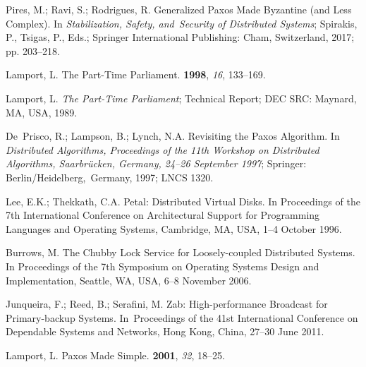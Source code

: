 \documentclass[algorithms,article,accept,moreauthors,pdftex,10pt,a4paper]{Definitions/mdpi}
\begin{document}
\begin{thebibliography}{999}

Pires, M.; Ravi, S.; Rodrigues, R.
\newblock Generalized Paxos Made Byzantine (and Less Complex).
\newblock In \emph{Stabilization, Safety, and~Security of Distributed Systems};
Spirakis, P., Tsigas, P., Eds.; Springer International Publishing: Cham, Switzerland, 
2017; pp. 203--218.

Lamport, L.
\newblock The {Part-Time} Parliament.
 {\bf 1998}, {\em
16}, 133--169.

Lamport, L.
\newblock \emph{The Part-Time Parliament};
\newblock Technical Report; DEC SRC: {Maynard, MA, USA}, 1989.

De~Prisco, R.; Lampson, B.; Lynch, N.A.
\newblock Revisiting the {Paxos} Algorithm.
\newblock In \emph{Distributed Algorithms, Proceedings of the 11th Workshop on Distributed Algorithms, Saarbrücken, Germany, 24--26 September 1997}; Springer: {\mbox{Berlin/Heidelberg, Germany}}, %
1997; {LNCS 1320}. %

Lee, E.K.; Thekkath, C.A.
\newblock Petal: Distributed Virtual Disks.
\newblock In Proceedings of the 7th International Conference on Architectural Support for Programming
Languages and Operating Systems, Cambridge, MA, USA, 1--4 October 1996.

Burrows, M.
\newblock The Chubby Lock Service for Loosely-coupled Distributed Systems.
\newblock In Proceedings of the 7th Symposium on Operating Systems Design and Implementation, Seattle, WA, USA, 6--8 November 2006.

Junqueira, F.; Reed, B.; Serafini, M.
\newblock Zab: High-performance Broadcast for Primary-backup Systems.
\newblock In~Proceedings of the 41st International Conference on Dependable Systems and Networks, Hong Kong, China, 27--30 June 2011.

Lamport, L.
\newblock Paxos Made Simple.
 {\bf 2001}, {\em 32}, 18--25.


\end{thebibliography}
\end{document}

